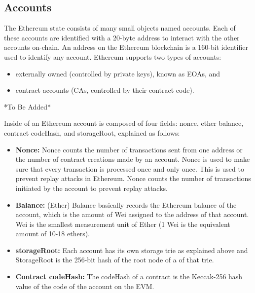     \subsection{Accounts}
        The Ethereum state consists of many small objects named accounts.
        Each of these accounts are identified with a 20-byte address to interact with the other accounts on-chain.
        An address on the Ethereum blockchain is a 160-bit identifier used to identify any account.
        Ethereum supports two types of accounts:
        \begin{itemize}
            \item externally owned (controlled by private keys), known as EOAs, and
            \item contract accounts (CAs, controlled by their contract code).~\cite{ethereum2014ethereum}
        \end{itemize}
        *To Be Added*
        
        Inside of an Ethereum account is composed of four fields: nonce, ether balance, contract codeHash, and storageRoot, explained as follows:

        \begin{itemize}
            \item \textbf{Nonce:} Nonce counts the number of transactions sent from one address or the number of contract creations made by an account.
                                  Nonce is used to make sure that every transaction is processed once and only once.
                                  This is used to prevent replay attacks in Ethereum.
                                  Nonce counts the number of transactions initiated by the account to prevent replay attacks.
            \item \textbf{Balance:} (Ether) Balance basically records the Ethereum balance of the account, which is the amount of Wei assigned to the address of that account.
                                    Wei is the smallest measurement unit of Ether (1 Wei is the equivalent amount of 10-18 ethers).
            \item \textbf{storageRoot:} Each account has its own storage trie as explained above and StorageRoot is the 256-bit hash of the root node of a of that trie.
            \item \textbf{Contract codeHash:} The codeHash of a contract is the Keccak-256 hash value of the code of the account on the EVM.
        \end{itemize}

